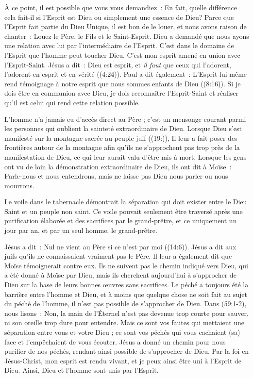 À ce point, il est possible que vous vous demandiez~:
 \og En fait, quelle différence cela fait-il si l'Esprit est Dieu
 ou simplement une essence de Dieu? \fg{}
 Parce que l'Esprit fait partie du Dieu Unique, il est bon de le louer,
 et nous avons raison de chanter~:
 \og Louez le Père, le Fils et le Saint-Esprit. \fg{}
 Dieu a demandé que nous ayons une relation avec lui par l'intermédiaire
 de l'Esprit. C'est dans le domaine de l'Esprit que l'homme peut toucher Dieu.
 C'est mon esprit amené en union avec l'Esprit-Saint. Jésus a dit~:
 \og Dieu est esprit, et \emph{il faut} que ceux qui l'adorent, l'adorent en esprit
 et en vérité \fg{} ((4:24)).
 Paul a dit également~: \og L'Esprit lui-même rend témoignage à notre esprit
 que nous sommes enfants de Dieu \fg{} ((8:16)).
 Si je dois être en communion avec Dieu, je dois reconnaître l'Esprit-Saint
 et réaliser qu'il est celui qui rend cette relation possible.

L'homme n'a jamais eu d'accès direct au Père ; c'est un mensonge courant parmi
 les personnes qui oublient la sainteté extraordinaire de Dieu.
 Lorsque Dieu s'est manifesté sur la montagne sacrée au peuple juif
 ((19:)), Il leur a fait poser des frontières autour de
 la montagne afin qu'ils ne s'approchent pas trop près de la manifestation
 de Dieu, ce qui leur aurait valu d'être mis à mort.
 Lorsque les gens ont vu de loin la démonstration extraordinaire de Dieu,
 ils ont dit à Moïse~:
 \og Parle-nous et nous entendrons, mais ne laisse pas Dieu nous parler
 ou nous mourrons. \fg{}

Le voile dans le tabernacle démontrait la séparation qui doit exister entre
 le Dieu Saint et un peuple non saint.
 Ce voile pouvait seulement être traversé après une purification élaborée
 et des sacrifices par le grand-prêtre, et ce uniquement un jour par an,
 et par un seul homme, le grand-prêtre.

Jésus a dit~: \og Nul ne vient au Père si ce n'est par moi \fg{}
 ((14:6)).
 Jésus a dit aux juifs qu'ils ne connaissaient vraiment pas le Père.
 Il leur a également dit que Moïse témoignerait contre eux.
 Ils ne suivent pas le chemin indiqué vers Dieu, qui a été donné
 à Moïse par Dieu, mais ils cherchent aujourd'hui à s'approcher de Dieu
 sur la base de leurs bonnes œuvres sans sacrifices.
 Le péché a toujours été la barrière entre l'homme et Dieu, et à moins
 que quelque chose ne soit fait au sujet du péché de l'homme,
 il n'est pas possible de s'approcher de Dieu.
 Dans (59:1-2), nous lisons~:
 \og Non, la main de l'Éternel n'est pas devenue trop courte pour sauver,
 ni son oreille trop dure pour entendre.
 Mais ce sont vos fautes qui mettaient une séparation entre vous et votre Dieu ;
 ce sont vos péchés qui vous cachaient (sa) face et l'empêchaient
 de vous écouter. \fg{}
 Jésus a donné un chemin pour nous purifier de nos péchés,
 rendant ainsi possible de s'approcher de Dieu.
 Par la foi en Jésus-Christ, mon esprit est rendu vivant, et je peux ainsi
 être uni à l'Esprit de Dieu. Ainsi, Dieu et l'homme sont unis par l'Esprit.

